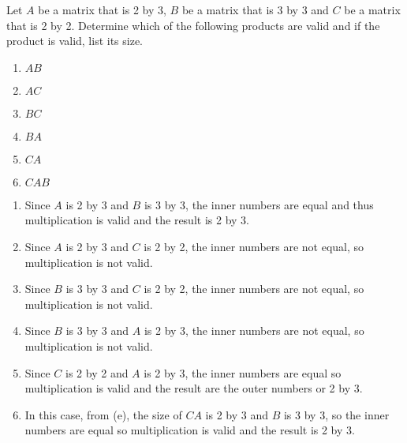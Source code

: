 \begin{example}
Let $A$ be a matrix that is 2 by 3, $B$ be a matrix that is 3 by 3 and $C$ be a matrix that is 2 by 2.  Determine which of the following products are valid and if the product is valid, list its size. 

\begin{multicols}{3}
\begin{enumerate}[label=(\alph*)]
\item $AB$ \item $AC$ \item $BC$	
\end{enumerate}
	
\end{multicols}
\begin{multicols}{3}
\begin{enumerate}[label=(\alph*)]\setcounter{enumi}{3}
\item $BA$ \item $CA$ \item $CAB$	
\end{enumerate}
	
\end{multicols}

\solution

\begin{enumerate}[label=(\alph*)]
\item Since $A$ is 2 by 3 and $B$ is 3 by 3, the inner numbers are equal and thus multiplication is valid and the result is 2 by 3.

\item Since $A$ is 2 by 3 and $C$ is 2 by 2, the inner numbers are not equal, so multiplication is not valid.

\item Since $B$ is 3 by 3 and $C$ is 2 by 2, the inner numbers are not equal, so multiplication is not valid. 

\item Since $B$ is 3 by 3 and $A$ is 2 by 3, the inner numbers are not equal, so multiplication is not valid.

\item Since $C$ is 2 by 2 and $A$ is 2 by 3, the inner numbers are equal so multiplication is valid and the result are the outer numbers or 2 by 3. 

\item In this case, from (e), the size of $CA$ is 2 by 3 and $B$ is 3 by 3, so the inner numbers are equal so multiplication is valid and the result is 2 by 3.   
	
\end{enumerate}


\end{example}

